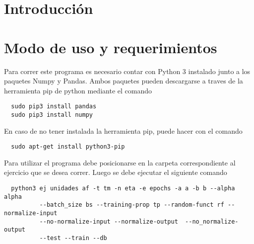 \section{Introducción}


\section{Modo de uso y requerimientos}
Para correr este programa es necesario contar con Python 3 instalado junto a los paquetes Numpy y Pandas. Ambos paquetes pueden descargarse a traves
de la herramienta pip de python mediante el comando
\begin{verbatim}
  sudo pip3 install pandas
  sudo pip3 install numpy
\end{verbatim}
En caso de no tener instalada la herramienta pip, puede hacer con el comando
\begin{verbatim}
  sudo apt-get install python3-pip
\end{verbatim}

Para utilizar el programa debe posicionarse en la carpeta correspondiente al ejercicio que se desea correr. Luego se debe ejecutar el siguiente comando
\begin{verbatim}
  python3 ej unidades af -t tm -n eta -e epochs -a a -b b --alpha alpha
          --batch_size bs --training-prop tp --random-funct rf --normalize-input
          --no-normalize-input --normalize-output  --no_normalize-output
          --test --train --db
\end{verbatim}

